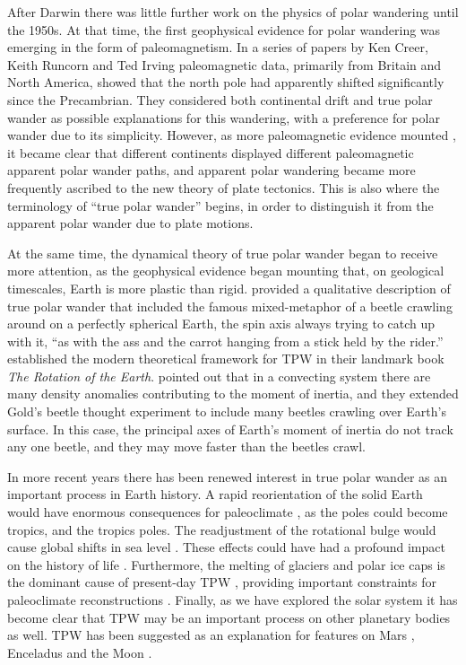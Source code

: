 After Darwin there was little further work on the physics of polar wandering
until the 1950s. At that time, the first geophysical evidence for polar wandering
was emerging in the form of paleomagnetism.
In a series of papers by Ken Creer, Keith Runcorn and Ted Irving 
\citep{creer1954direction, runcorn1955rock, creer1957geophysical} paleomagnetic data,
primarily from Britain and North America, showed that the north pole had apparently shifted significantly
since the Precambrian. They considered both continental drift and true polar wander
as possible explanations for this wandering, with a preference for polar wander due to its simplicity.
However, as more paleomagnetic evidence mounted \citep[e.g.][]{irving1958polar}, it became clear
that different continents displayed different paleomagnetic apparent polar wander paths,
and apparent polar wandering became more frequently ascribed to the new theory of plate tectonics.
This is also where the terminology of ``true polar wander'' begins, in order to distinguish
it from the apparent polar wander due to plate motions.

At the same time, the dynamical theory of true polar wander began to receive more attention,
as the geophysical evidence began mounting that, on geological timescales, Earth is more
plastic than rigid. \citet{gold1955instability} provided a qualitative description of
true polar wander that included the famous mixed-metaphor of a beetle crawling
around on a perfectly spherical Earth, the spin axis always trying to catch up with it,
``as with the ass and the carrot hanging from a stick held by the rider.''
\citet{munk1960rotation} established the modern theoretical framework for TPW in their
landmark book \emph{The Rotation of the Earth}.
\citet{goldreich1969some} pointed out that in a convecting system there
are many density anomalies contributing to the moment of inertia,
and they extended Gold's beetle thought experiment to include many beetles crawling over Earth's surface. 
In this case, the principal axes of Earth's moment of inertia do not track any one beetle,
and they may move faster than the beetles crawl.

In more recent years there has been renewed interest in true polar wander as an important process in Earth history.
A rapid reorientation of the solid Earth would have enormous consequences for paleoclimate \citep{kirschvink1997evidence},
as the poles could become tropics, and the tropics poles. The readjustment of the rotational
bulge would cause global shifts in sea level \citep{mound1999sea}.
These effects could have had a profound impact on the history of life \citep[e.g][]{kirschvink2003methane}.
Furthermore, the melting of glaciers and polar ice caps is the dominant cause of present-day TPW \citep{adhikari2016climate},
providing important constraints for paleoclimate reconstructions \citep{milne1996postglacial}. 
Finally, as we have explored the solar system it has become clear that TPW
may be an important process on other planetary bodies as well.
TPW has been suggested as an explanation for features on Mars \citep{perron2007evidence},
Enceladus \citep{nimmo2006diapir} and the Moon \citep{garrick2014tidal}.


